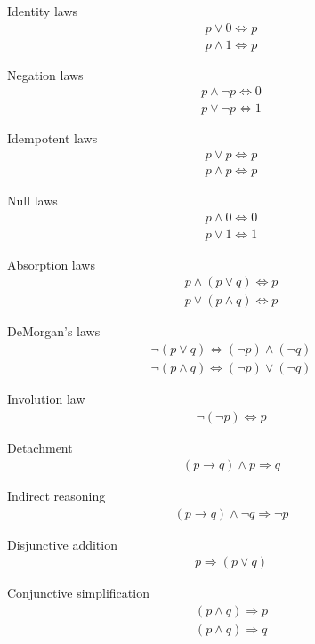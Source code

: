 \documentclass{article}
\begin{document}
Identity laws
\begin{gather*}
    p \lor 0 \Leftrightarrow p \\
    p \land 1 \Leftrightarrow p
\end{gather*}

Negation laws
\begin{gather*}
    p \land \neg p \Leftrightarrow 0 \\
    p \lor \neg p \Leftrightarrow 1
\end{gather*}

Idempotent laws
\begin{gather*}
    p \lor p \Leftrightarrow p \\
    p \land p \Leftrightarrow p
\end{gather*}

Null laws
\begin{gather*}
    p \land 0 \Leftrightarrow 0 \\
    p \lor 1 \Leftrightarrow 1
\end{gather*}

Absorption laws
\begin{gather*}
    p \land (p \lor q) \Leftrightarrow p \\
    p \lor (p \land q) \Leftrightarrow p
\end{gather*}

DeMorgan's laws
\begin{gather*}
    \neg (p \lor q) \Leftrightarrow (\neg p) \land (\neg q) \\
    \neg (p \land q) \Leftrightarrow (\neg p) \lor (\neg q)
\end{gather*}

Involution law
\begin{gather*}
    \neg (\neg p) \Leftrightarrow p
\end{gather*}

Detachment
\begin{gather*}
    (p \rightarrow q) \land p \Rightarrow q
\end{gather*}

Indirect reasoning
\begin{gather*}
    (p \rightarrow q) \land \neg q \Rightarrow \neg p
\end{gather*}

Disjunctive addition
\begin{gather*}
    p \Rightarrow (p \lor q)
\end{gather*}

Conjunctive simplification
\begin{gather*}
    (p \land q) \Rightarrow p \\
    (p \land q) \Rightarrow q
\end{gather*}
\end{document}
